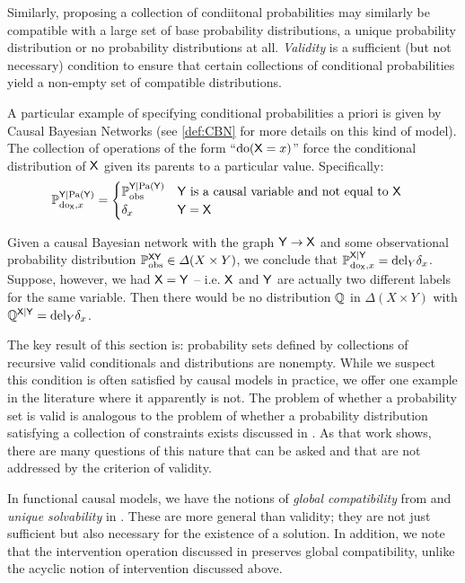 Similarly, proposing a collection of condiitonal probabilities may similarly be compatible with a large set of base probability distributions, a unique probability distribution or no probability distributions at all. \emph{Validity} is a sufficient (but not necessary) condition to ensure that certain collections of conditional probabilities yield a non-empty set of compatible distributions.

A particular example of specifying conditional probabilities a priori is given by Causal Bayesian Networks (see \ref{def:CBN} for more details on this kind of model). The collection of operations of the form ``$\mathrm{do}(\mathsf{X}=x)$'' force the conditional distribution of $\mathsf{X}$ given its parents to a particular value. Specifically:
\begin{align}
	\mathbb{P}_{\mathrm{do}_{\mathsf{X}},x}^{\mathsf{Y}|\mathrm{Pa}(\mathsf{Y})} &= \begin{cases}
	\mathbb{P}_{\mathrm{obs}}^{\mathsf{Y}|\mathrm{Pa}(\mathsf{Y})}&\mathsf{Y}\text{ is a causal variable and not equal to }\mathsf{X}\\
	\delta_x & \mathsf{Y}=\mathsf{X}
	\end{cases}
\end{align}

Given a causal Bayesian network with the graph $\mathsf{Y}\rightarrow \mathsf{X}$ and some observational probability distribution $\mathbb{P}_{\mathrm{obs}}^{\mathsf{XY}}\in\Delta(X\times Y)$, we conclude that $\mathbb{P}_{\mathrm{do}_{\mathsf{X}},x}^{\mathsf{X}|\mathsf{Y}}=\text{del}_Y \delta_x$. Suppose, however, we had $\mathsf{X}=\mathsf{Y}$ -- i.e. $\mathsf{X}$ and $\mathsf{Y}$ are actually two different labels for the same variable. Then there would be no distribution $\mathbb{Q}$ in $\Delta(X\times Y)$ with $\mathbb{Q}^{\mathsf{X}|\mathsf{Y}}=\text{del}_Y \delta_x$.

The key result of this section is: probability sets defined by collections of recursive valid conditionals and distributions are nonempty. While we suspect this condition is often satisfied by causal models in practice, we offer one example in the literature where it apparently is not. The problem of whether a probability set is valid is analogous to the problem of whether a probability distribution satisfying a collection of constraints exists discussed in \citet{vorobev_consistent_1962}. As that work shows, there are many questions of this nature that can be asked and that are not addressed by the criterion of validity.

In functional causal models, we have the notions of \emph{global compatibility} from \citet{forre_causal_2020} and \emph{unique solvability} in \citet{bongers_theoretical_2016}. These are more general than validity; they are not just sufficient but also necessary for the existence of a solution. In addition, we note that the intervention operation discussed in \citet{forre_causal_2020} preserves global compatibility, unlike the acyclic notion of intervention discussed above.

